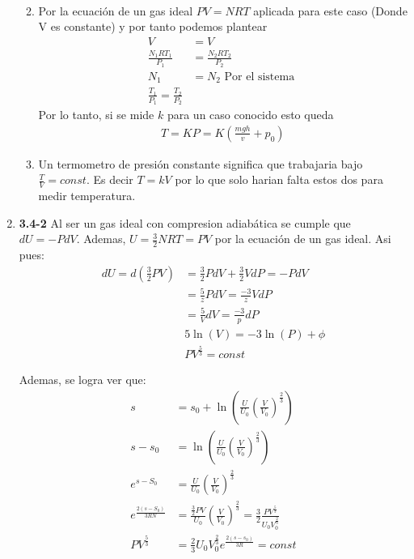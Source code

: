 \documentclass[12pt]{exam}
\begin{document}
\begin{enumerate}
\begin{enumerate}
\begin{align*}
				\end{align*}
			\item Por la ecuación de un gas ideal $PV = NRT$ aplicada para este caso (Donde V es constante) y por tanto podemos plantear
				\begin{align*}
					V &= V\\
					\frac{N_1RT_1}{P_1} &= \frac{N_2RT_2}{P_2}\\
					N_1 &= N_2 \text{ Por el sistema }\\
					\frac{T_1}{P_1} = \frac{T_2}{P_2}
				\end{align*}
				Por lo tanto, si se mide $k$ para un caso conocido esto queda
				\begin{align*}
					T = KP = K\left(\frac{mgh}{v}+p_0\right)
				\end{align*}
			\item Un termometro de presión constante significa que trabajaria bajo $\frac{T}{V} = const$. Es decir $T=kV$ por lo que solo harian falta estos dos para medir temperatura.
\end{enumerate}
	\item \textbf{3.4-2} Al ser un gas ideal con compresion adiabática se cumple que $dU = -PdV$. Ademas, $U=\frac{3}{2}NRT=PV$ por la ecuación de un gas ideal. Asi pues:
		\begin{align*}
			dU = d\left(\frac{3}{2}PV\right)&=\frac{3}{2}PdV + \frac{3}{2}VdP = -PdV\\
			&=\frac{5}{z}PdV = \frac{-3}{z}VdP\\
			&=\frac{5}{V}dV = \frac{-3}{p}dP\\
			&5\ln(V)=-3\ln(P) + \phi\\
			&PV^{\frac{5}{3}}=const
		\end{align*}

		Ademas, se logra ver que:
		\begin{align*}
			s &= s_0 + \ln\left(\frac{U}{U_0}\left(\frac{V}{V_0}\right)^{\frac{2}{3}}\right)\\
			s-s_0 &= \ln\left(\frac{U}{U_0}\left(\frac{V}{V_0}\right)^{\frac{2}{3}}\right)\\
			e^{s-S_0} &= \frac{U}{U_0}\left(\frac{V}{V_0}\right)^{\frac{2}{3}}\\
			e^{\frac{2(s-S_0)}{3RN}} &= \frac{\frac{3}{2}PV}{U_0}\left(\frac{V}{V_0}\right)^{\frac{2}{3}}=\frac{3}{2}\frac{PV^{\frac{5}{3}}}{U_0V_0^{\frac{2}{3}}}\\
			PV^{\frac{5}{3}}&=\frac{2}{3}U_0V_0^{\frac{2}{3}}e^{\frac{2(s-s_0)}{3R}} = const
		\end{align*}
	\end{enumerate}
\end{document}
